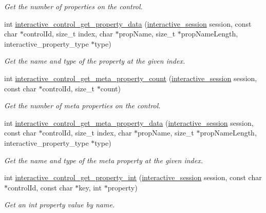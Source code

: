 \begin{DoxyCompactItemize}
\begin{DoxyCompactList}\small\item\em Get the number of properties on the control. \end{DoxyCompactList}\item 
int \mbox{\hyperlink{group___interactivity_ga92ecffab048b677c393b2e1a7ee53459}{interactive\+\_\+control\+\_\+get\+\_\+property\+\_\+data}} (\mbox{\hyperlink{group___interactivity_ga6d8819d38b8dc8994a2299cf22a65a31}{interactive\+\_\+session}} session, const char $\ast$control\+Id, size\+\_\+t index, char $\ast$prop\+Name, size\+\_\+t $\ast$prop\+Name\+Length, interactive\+\_\+property\+\_\+type $\ast$type)
\begin{DoxyCompactList}\small\item\em Get the name and type of the property at the given index. \end{DoxyCompactList}\item 
int \mbox{\hyperlink{group___interactivity_ga0d3a1209d3dc7eaaff8c37d7487cad30}{interactive\+\_\+control\+\_\+get\+\_\+meta\+\_\+property\+\_\+count}} (\mbox{\hyperlink{group___interactivity_ga6d8819d38b8dc8994a2299cf22a65a31}{interactive\+\_\+session}} session, const char $\ast$control\+Id, size\+\_\+t $\ast$count)
\begin{DoxyCompactList}\small\item\em Get the number of meta properties on the control. \end{DoxyCompactList}\item 
int \mbox{\hyperlink{group___interactivity_ga261e805db857d306ced68f4da8cc0294}{interactive\+\_\+control\+\_\+get\+\_\+meta\+\_\+property\+\_\+data}} (\mbox{\hyperlink{group___interactivity_ga6d8819d38b8dc8994a2299cf22a65a31}{interactive\+\_\+session}} session, const char $\ast$control\+Id, size\+\_\+t index, char $\ast$prop\+Name, size\+\_\+t $\ast$prop\+Name\+Length, interactive\+\_\+property\+\_\+type $\ast$type)
\begin{DoxyCompactList}\small\item\em Get the name and type of the meta property at the given index. \end{DoxyCompactList}\item 
int \mbox{\hyperlink{group___interactivity_ga9aa662d8d4a7ab33f073a275e8bf6a3b}{interactive\+\_\+control\+\_\+get\+\_\+property\+\_\+int}} (\mbox{\hyperlink{group___interactivity_ga6d8819d38b8dc8994a2299cf22a65a31}{interactive\+\_\+session}} session, const char $\ast$control\+Id, const char $\ast$key, int $\ast$property)
\begin{DoxyCompactList}\small\item\em Get an {\ttfamily int} property value by name. \end{DoxyCompactList}\item 

\end{DoxyCompactItemize}
